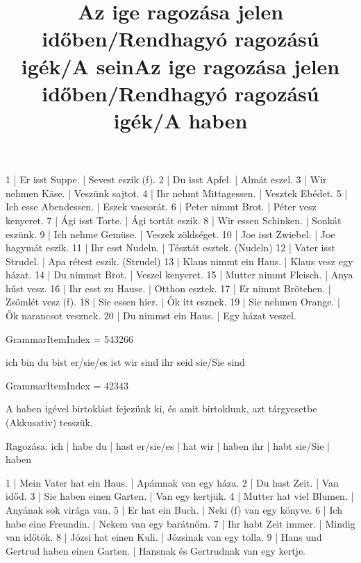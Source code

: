 \begin{exmp}
1 | Er isst Suppe. | Sevest eszik (f).
2 | Du isst Apfel. | Almát eszel.
3 | Wir nehmen Käse. | Veszünk sajtot.
4 | Ihr nehmt Mittagessen. | Vesztek Ebédet.
5 | Ich esse Abendessen. | Eszek vacsorát.
6 | Peter nimmt Brot. | Péter vesz kenyeret.
7 | Ági isst Torte. | Ági tortát eszik.
8 | Wir essen Schinken. | Sonkát eszünk.
9 | Ich nehme Gemüse. | Veszek zöldséget.
10 | Joe isst Zwiebel. | Joe hagymát eszik.
11 | Ihr esst Nudeln. | Tésztát esztek. (Nudeln)
12 | Vater isst Strudel. | Apa rétest eszik. (Strudel)
13 | Klaus nimmt ein Haus. | Klaus vesz egy házat.
14 | Du nimmst Brot. | Veszel kenyeret.
15 | Mutter nimmt Fleisch. | Anya húst vesz.
16 | Ihr esst zu Hause. | Otthon esztek.
17 | Er nimmt Brötchen. | Zsömlét vesz (f).
18 | Sie essen hier. | Ők itt esznek.
19 | Sie nehmen Orange. | Ők narancsot vesznek.
20 | Du nimmst ein Haus. | Egy házat veszel.
\end{exmp}

\title{Az ige ragozása jelen időben/Rendhagyó ragozású igék/A sein}

GrammarItemIndex = 543266

\begin{desc}
ich bin 
du bist 
er/sie/es ist 
wir sind 
ihr seid 
sie/Sie sind 
\end{desc}

\begin{exmp}
\end{exmp}

\title{Az ige ragozása jelen időben/Rendhagyó ragozású igék/A haben}

GrammarItemIndex = 42343

\begin{desc}
A haben igével birtoklást fejezünk ki, és amit birtoklunk, azt tárgyesetbe (Akkusativ) tesszük.

Ragozása:
ich       | habe
du        | hast
er/sie/es | hat
wir       | haben
ihr       | habt
sie/Sie   | haben
\end{desc}

\begin{exmp}
1 | Mein Vater hat ein Haus. | Apámnak van egy háza.
2 | Du hast Zeit. | Van időd.
3 | Sie haben einen Garten. | Van egy kertjük.
4 | Mutter hat viel Blumen. | Anyának sok virága van.
5 | Er hat ein Buch. | Neki (f) van egy könyve.
6 | Ich habe eine Freundin. | Nekem van egy barátnőm.
7 | Ihr habt Zeit immer. | Mindig van időtök.
8 | Józsi hat einen Kuli. | Józsinak van egy tolla.
9 | Hans und Gertrud haben einen Garten. | Hansnak és Gertrudnak van egy kertje.
\end{exmp}

